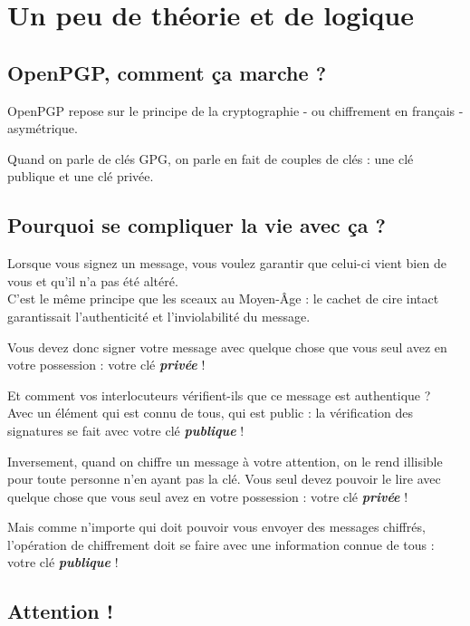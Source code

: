 \chapter{Un peu de théorie et de logique}

\section{OpenPGP, comment ça marche ?}\label{openpgp-comment-uxe7a-marche}

OpenPGP repose sur le principe de la cryptographie - ou chiffrement en français - asymétrique.

Quand on parle de clés GPG, on parle en fait de couples de clés : une clé publique et une clé privée.

\section{Pourquoi se compliquer la vie avec ça ?}\label{pourquoi-se-compliquer-la-vie-avec-uxe7a}

Lorsque vous signez un message, vous voulez garantir que celui-ci vient
bien de vous et qu'il n'a pas été altéré.\\C'est le même principe que
les sceaux au Moyen-Âge : le cachet de cire intact garantissait
l'authenticité et l'inviolabilité du message.

Vous devez donc signer votre message avec quelque chose que vous seul
avez en votre possession : votre clé \textbf{\emph{privée}} !

Et comment vos interlocuteurs vérifient-ils que ce message est
authentique ?\\Avec un élément qui est connu de tous, qui est public :
la vérification des signatures se fait avec votre clé
\textbf{\emph{publique}} !

Inversement, quand on chiffre un message à votre attention, on le rend
illisible pour toute personne n'en ayant pas la clé. Vous seul devez
pouvoir le lire avec quelque chose que vous seul avez en votre
possession : votre clé \textbf{\emph{privée}} !

Mais comme n'importe qui doit pouvoir vous envoyer des messages
chiffrés, l'opération de chiffrement doit se faire avec une information
connue de tous : votre clé \textbf{\emph{publique}} !

\section{Attention !}\label{attention}

